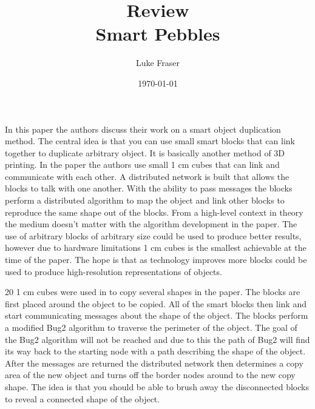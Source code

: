 \documentclass{article}
\begin{document}
\title{{\large Review} \\ Smart Pebbles}
\author{Luke Fraser}
\date{\today}
\maketitle

\begingroup
\renewcommand{\section}[2]{}


\endgroup

\section*{Summary}
In this paper the authors discuss their work on a smart object duplication method. The central idea is that you can use small smart blocks that can link together to duplicate arbitrary object. It is basically another method of 3D printing. In the paper the authors use small 1 cm cubes that can link and communicate with each other. A distributed network is built that allows the blocks to talk with one another. With the ability to pass messages the blocks perform a distributed algorithm to map the object and link other blocks to reproduce the same shape out of the blocks. From a high-level context in theory the medium doesn't matter with the algorithm development in the paper. The use of arbitrary blocks of arbitrary size could be used to produce better results, however due to hardware limitations 1 cm cubes is the smallest achievable at the time of the paper. The hope is that as technology improves more blocks could be used to produce high-resolution representations of objects.

20 1 cm cubes were used in to copy several shapes in the paper. The blocks are first placed around the object to be copied. All of the smart blocks then link and start communicating messages about the shape of the object. The blocks perform a modified Bug2 algorithm to traverse the perimeter of the object. The goal of the Bug2 algorithm will not be reached and due to this the path of Bug2 will find its way back to the starting node with a path describing the shape of the object. After the messages are returned the distributed network then determines a copy area of the new object and turns off the border nodes around to the new copy shape. The idea is that you should be able to brush away the disconnected blocks to reveal a connected shape of the object.
\end{document}
